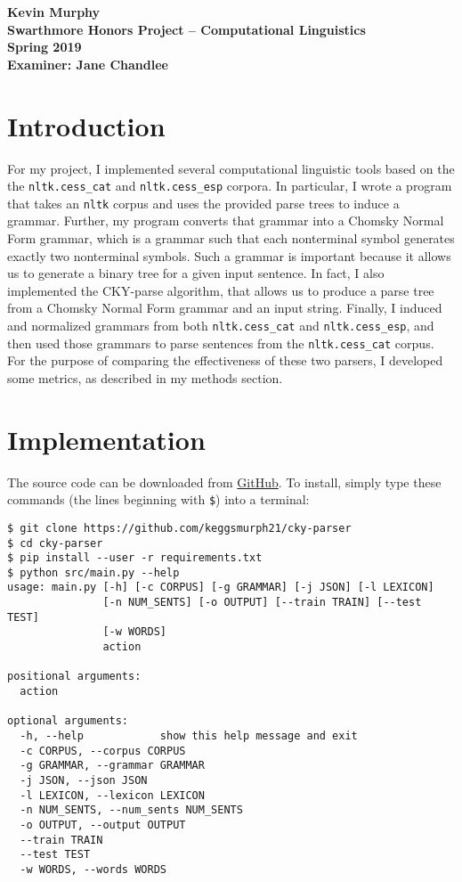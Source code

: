 \documentclass[paper=a4, fontsize=11pt]{scrartcl} %
\begin{document}
\textbf{%
Kevin Murphy\\
Swarthmore Honors Project -- Computational Linguistics\\
Spring 2019\\
Examiner: Jane Chandlee\\
}

\vspace{-20pt}

\section*{Introduction}

For my project, I implemented several computational linguistic tools based on the the \texttt{nltk.cess\_cat} and \texttt{nltk.cess\_esp} corpora.  In particular, I wrote a program that takes an \texttt{nltk} corpus and uses the provided parse trees to induce a grammar.  Further, my program converts that grammar into a Chomsky Normal Form grammar, which is a grammar such that each nonterminal symbol generates exactly two nonterminal symbols.  Such a grammar is important because it allows us to generate a binary tree for a given input sentence.  In fact, I also implemented the CKY-parse algorithm, that allows us to produce a parse tree from a Chomsky Normal Form grammar and an input string.  Finally, I induced and normalized grammars from both \texttt{nltk.cess\_cat} and \texttt{nltk.cess\_esp}, and then used those grammars to parse sentences from the \texttt{nltk.cess\_cat} corpus.  For the purpose of comparing the effectiveness of these two parsers, I developed some metrics, as described in my methods section.

\section*{Implementation}

The source code can be downloaded from \href{https://github.com/keggsmurph21/cky-parser}{GitHub}.  To install, simply type these commands (the lines beginning with \texttt{\$}) into a terminal:
\begin{verbatim}
$ git clone https://github.com/keggsmurph21/cky-parser
$ cd cky-parser
$ pip install --user -r requirements.txt
$ python src/main.py --help
usage: main.py [-h] [-c CORPUS] [-g GRAMMAR] [-j JSON] [-l LEXICON]
               [-n NUM_SENTS] [-o OUTPUT] [--train TRAIN] [--test TEST]
               [-w WORDS]
               action

positional arguments:
  action

optional arguments:
  -h, --help            show this help message and exit
  -c CORPUS, --corpus CORPUS
  -g GRAMMAR, --grammar GRAMMAR
  -j JSON, --json JSON
  -l LEXICON, --lexicon LEXICON
  -n NUM_SENTS, --num_sents NUM_SENTS
  -o OUTPUT, --output OUTPUT
  --train TRAIN
  --test TEST
  -w WORDS, --words WORDS

\end{verbatim}
\end{document}
